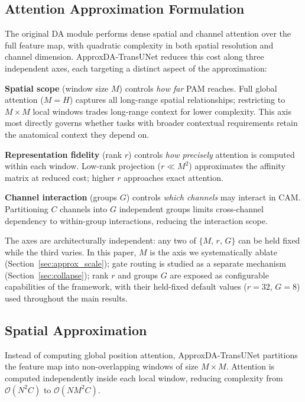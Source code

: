 \subsection{Attention Approximation Formulation}

The original DA module performs dense spatial and channel attention over the full feature map, with quadratic complexity in both spatial resolution and channel dimension. ApproxDA-TransUNet reduces this cost along three independent axes, each targeting a distinct aspect of the approximation:

\textbf{Spatial scope} (window size $M$) controls \emph{how far} PAM reaches. Full global attention ($M{=}H$) captures all long-range spatial relationships; restricting to $M{\times}M$ local windows trades long-range context for lower complexity. This axis most directly governs whether tasks with broader contextual requirements retain the anatomical context they depend on.

\textbf{Representation fidelity} (rank $r$) controls \emph{how precisely} attention is computed within each window. Low-rank projection ($r \ll M^2$) approximates the affinity matrix at reduced cost; higher $r$ approaches exact attention.

\textbf{Channel interaction} (groups $G$) controls \emph{which channels} may interact in CAM. Partitioning $C$ channels into $G$ independent groups limits cross-channel dependency to within-group interactions, reducing the interaction scope.

The axes are architecturally independent: any two of $\{M,\,r,\,G\}$ can be held fixed while the third varies. In this paper, $M$ is the axis we systematically ablate (Section~\ref{sec:approx_scale}); gate routing is studied as a separate mechanism (Section~\ref{sec:collapse}); rank $r$ and groups $G$ are exposed as configurable capabilities of the framework, with their held-fixed default values ($r{=}32$, $G{=}8$) used throughout the main results.

\subsection{Spatial Approximation}

Instead of computing global position attention, ApproxDA-TransUNet partitions the feature map into non-overlapping windows of size $M{\times}M$. Attention is computed independently inside each local window, reducing complexity from $\mathcal{O}(N^2C)$ to $\mathcal{O}(NM^2C)$.

